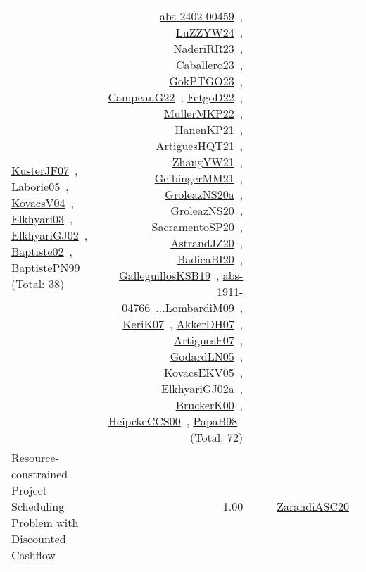 {\begin{longtable}{p{3cm}r>{\raggedright\arraybackslash}p{6cm}>{\raggedright\arraybackslash}p{6cm}>{\raggedright\arraybackslash}p{8cm}}
\href{../works/KusterJF07.pdf}{KusterJF07}~\cite{KusterJF07}, \href{../works/Laborie05.pdf}{Laborie05}~\cite{Laborie05}, \href{../works/KovacsV04.pdf}{KovacsV04}~\cite{KovacsV04}, \href{../works/Elkhyari03.pdf}{Elkhyari03}~\cite{Elkhyari03}, \href{../works/ElkhyariGJ02.pdf}{ElkhyariGJ02}~\cite{ElkhyariGJ02}, \href{../works/Baptiste02.pdf}{Baptiste02}~\cite{Baptiste02}, \href{../works/BaptistePN99.pdf}{BaptistePN99}~\cite{BaptistePN99} (Total: 38) & \href{../works/abs-2402-00459.pdf}{abs-2402-00459}~\cite{abs-2402-00459}, \href{../works/LuZZYW24.pdf}{LuZZYW24}~\cite{LuZZYW24}, \href{../works/NaderiRR23.pdf}{NaderiRR23}~\cite{NaderiRR23}, \href{../works/Caballero23.pdf}{Caballero23}~\cite{Caballero23}, \href{../works/GokPTGO23.pdf}{GokPTGO23}~\cite{GokPTGO23}, \href{../works/CampeauG22.pdf}{CampeauG22}~\cite{CampeauG22}, \href{../works/FetgoD22.pdf}{FetgoD22}~\cite{FetgoD22}, \href{../works/MullerMKP22.pdf}{MullerMKP22}~\cite{MullerMKP22}, \href{../works/HanenKP21.pdf}{HanenKP21}~\cite{HanenKP21}, \href{../works/ArtiguesHQT21.pdf}{ArtiguesHQT21}~\cite{ArtiguesHQT21}, \href{../works/ZhangYW21.pdf}{ZhangYW21}~\cite{ZhangYW21}, \href{../works/GeibingerMM21.pdf}{GeibingerMM21}~\cite{GeibingerMM21}, \href{../works/GroleazNS20a.pdf}{GroleazNS20a}~\cite{GroleazNS20a}, \href{../works/GroleazNS20.pdf}{GroleazNS20}~\cite{GroleazNS20}, \href{../works/SacramentoSP20.pdf}{SacramentoSP20}~\cite{SacramentoSP20}, \href{../works/AstrandJZ20.pdf}{AstrandJZ20}~\cite{AstrandJZ20}, \href{../works/BadicaBI20.pdf}{BadicaBI20}~\cite{BadicaBI20}, \href{../works/GalleguillosKSB19.pdf}{GalleguillosKSB19}~\cite{GalleguillosKSB19}, \href{../works/abs-1911-04766.pdf}{abs-1911-04766}~\cite{abs-1911-04766}...\href{../works/LombardiM09.pdf}{LombardiM09}~\cite{LombardiM09}, \href{../works/KeriK07.pdf}{KeriK07}~\cite{KeriK07}, \href{../works/AkkerDH07.pdf}{AkkerDH07}~\cite{AkkerDH07}, \href{../works/ArtiguesF07.pdf}{ArtiguesF07}~\cite{ArtiguesF07}, \href{../works/GodardLN05.pdf}{GodardLN05}~\cite{GodardLN05}, \href{../works/KovacsEKV05.pdf}{KovacsEKV05}~\cite{KovacsEKV05}, \href{../works/ElkhyariGJ02a.pdf}{ElkhyariGJ02a}~\cite{ElkhyariGJ02a}, \href{../works/BruckerK00.pdf}{BruckerK00}~\cite{BruckerK00}, \href{../works/HeipckeCCS00.pdf}{HeipckeCCS00}~\cite{HeipckeCCS00}, \href{../works/PapaB98.pdf}{PapaB98}~\cite{PapaB98} (Total: 72)\\
\index{Resource-constrained Project Scheduling Problem with Discounted Cashflow}\index{Classification!Resource-constrained Project Scheduling Problem with Discounted Cashflow}Resource-constrained Project Scheduling Problem with Discounted Cashflow &  1.00 &  &  & \href{../works/ZarandiASC20.pdf}{ZarandiASC20}~\cite{ZarandiASC20}\\

\end{longtable}}
